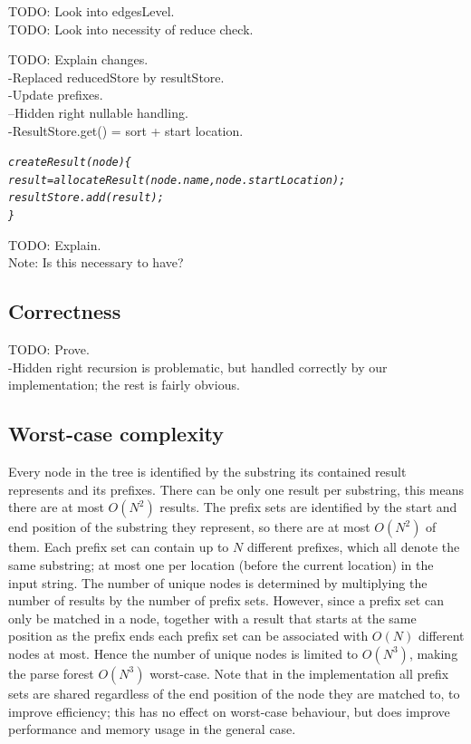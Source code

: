 \documentclass[a4paper,10pt]{article}
\begin{document}
TODO: Look into edgesLevel.\\
TODO: Look into necessity of reduce check.

TODO: Explain changes.\\
-Replaced reducedStore by resultStore.\\
-Update prefixes.\\
--Hidden right nullable handling.\\
-ResultStore.get() = sort + start location.

{\small
\begin{alltt}
\textit{createResult(node)\{
  result = allocateResult(node.name, node.startLocation);
  resultStore.add(result);
\}}
\end{alltt}
}

TODO: Explain.\\
Note: Is this necessary to have?

\subsection{Correctness}

TODO: Prove.\\
-Hidden right recursion is problematic, but handled correctly by our implementation; the rest is fairly obvious.

\subsection{Worst-case complexity}
Every node in the tree is identified by the substring its contained result represents and its prefixes. There can be only one result per substring, this means there are at most $O(N^2)$ results. The prefix sets are identified by the start and end position of the substring they represent, so there are at most $O(N^2)$ of them. Each prefix set can contain up to $N$ different prefixes, which all denote the same substring; at most one per location (before the current location) in the input string. The number of unique nodes is determined by multiplying the number of results by the number of prefix sets. However, since a prefix set can only be matched in a node, together with a result that starts at the same position as the prefix ends each prefix set can be associated with $O(N)$ different nodes at most. Hence the number of unique nodes is limited to $O(N^3)$, making the parse forest $O(N^3)$ worst-case. Note that in the implementation all prefix sets are shared regardless of the end position of the node they are matched to, to improve efficiency; this has no effect on worst-case behaviour, but does improve performance and memory usage in the general case.
\end{document}
